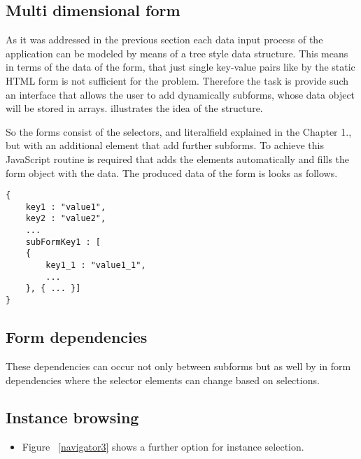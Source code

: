 \subsection{Multi dimensional form}

As it was addressed in the previous section each data input process of the application can be modeled by means of a tree style data structure. This means in terms of the data of the form, that just single key-value pairs like by the static HTML form is not sufficient for the problem. Therefore the task is provide such an interface that allows the user to add dynamically subforms, whose data object will be stored in arrays.  illustrates the idea of the structure. 


So the forms consist of the selectors, and literalfield explained in the Chapter 1., but with an additional element that add further subforms. To achieve this JavaScript routine is required that adds the elements automatically and fills the form object with the data. The produced data of the form is looks as follows.


\begin{lstlisting}[captionpos=b, caption=JSON object of the form, label=3rd:sparql,
basicstyle=\footnotesize,frame=single]
{
	key1 : "value1",
	key2 : "value2",
	...
	subFormKey1 : [
	{
		key1_1 : "value1_1",
		...				
	}, { ... }]
}
\end{lstlisting}


\subsection{Form dependencies} \label{formDependencies}



These dependencies can occur not only between subforms but as well by in form dependencies where the selector elements can change based on selections.

\subsection{Instance browsing}


\begin{itemize}
	\item Figure ~\ref{navigator3} shows a further option for instance selection. 
\end{itemize}

